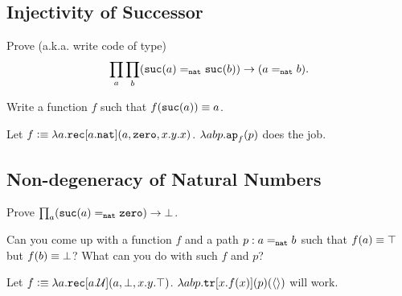 \documentclass[12pt]{article}
\newcommand{\cut}[1]{}
\newcommand{\marksolution}[1]{\color{FireBrick}#1\normalcolor}%
\newcommand{\marksolution}[1]{\cut{#1}}%
\newenvironment{solution}{\trivlist \item[\hskip \labelsep{\bf
Solution:}]}{\endtrivlist}
\begin{document}
\subsection{Injectivity of Successor}

\begin{task}
  Prove (a.k.a. write code of type)
  \[
    \prod_a \prod_b (\mathtt{suc}(a) =_{\mathtt{nat}} \mathtt{suc}(b)) \to (a =_{\mathtt{nat}} b).
  \]
  \begin{hint}
    Write a function $f$ such that $f(\mathtt{suc}(a)) \equiv a$.
  \end{hint}
\end{task}
\marksolution{
\begin{solution}
  Let $f \vcentcolon\equiv \lambda a.\mathtt{rec}[a.\mathtt{nat}](a, \mathtt{zero}, x.y.x)$. $\lambda abp.\mathtt{ap}_f(p)$ does the job.
\end{solution}
}

\subsection{Non-degeneracy of Natural Numbers}

\begin{task}
  Prove $\prod_a (\mathtt{suc}(a) =_{\mathtt{nat}} \mathtt{zero}) \to \bot$.
  \begin{hint}
    Can you come up with a function $f$ and a path $p : a =_{\mathtt{nat}} b$ such that
    $f(a) \equiv \top$ but $f(b) \equiv \bot$?
    What can you do with such $f$ and $p$?
  \end{hint}
\end{task}
\marksolution{
\begin{solution}
  Let $f \vcentcolon\equiv \lambda a.\mathtt{rec}[a.\mathcal{U}](a, \bot, x.y.\top)$. $\lambda abp.\mathtt{tr}[x.f(x)](p)(\langle\rangle)$ will work.
\end{solution}
}
\end{document}
